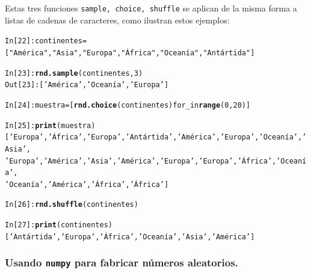 \documentclass[10pt,a4paper]{article}\usepackage[]{graphicx}\usepackage[]{color}
\makeatletter
\newcommand{\hlstr}[1]{\textcolor[rgb]{0.192,0.494,0.8}{#1}}%
\newcommand{\hlkwd}[1]{\textcolor[rgb]{0.737,0.353,0.396}{\textbf{#1}}}%
\newenvironment{kframe}{%
 \def\at@end@of@kframe{}%
 \ifinner\ifhmode%
  \def\at@end@of@kframe{\end{minipage}}%
  \begin{minipage}{\columnwidth}%
 \fi\fi%
 \def\FrameCommand##1{\hskip\@totalleftmargin \hskip-\fboxsep
 \colorbox{shadecolor}{##1}\hskip-\fboxsep
     \hskip-\linewidth \hskip-\@totalleftmargin \hskip\columnwidth}%
 \MakeFramed {\advance\hsize-\width
   \@totalleftmargin\z@ \linewidth\hsize
   \@setminipage}}%
 {\par\unskip\endMakeFramed%
 \at@end@of@kframe}
\newenvironment{knitrout}{}{} %
\newcounter {cont01}
\makeatother
\begin{document}
Estas tres funciones {\tt sample, choice, shuffle} se aplican de la misma forma a listas de cadenas de caracteres, como ilustran estos ejemplos:
\begin{knitrout}
\color{fgcolor}\begin{kframe}
\begin{alltt}
In [22]: continentes = [\hlstr{"América"}, \hlstr{"Asia"}, \hlstr{"Europa"}, \hlstr{"África"}, \hlstr{"Oceanía"}, \hlstr{"Antártida"}]

In [23]: \hlkwd{rnd.sample}(continentes, 3)
Out[23]: [\hlstr{'América'}, \hlstr{'Oceanía'}, \hlstr{'Europa'}]

In [24]: muestra = [\hlkwd{rnd.choice}(continentes) for _ in \hlkwd{range}(0, 20)]

In [25]: \hlkwd{print}(muestra)
[\hlstr{'Europa'}, \hlstr{'África'}, \hlstr{'Europa'}, \hlstr{'Antártida'}, \hlstr{'América'}, \hlstr{'Europa'}, \hlstr{'Oceanía'}, \hlstr{'Asia'},
\hlstr{'Europa'}, \hlstr{'América'}, \hlstr{'Asia'}, \hlstr{'América'}, \hlstr{'Europa'}, \hlstr{'Europa'}, \hlstr{'África'}, \hlstr{'Oceanía'},
\hlstr{'Oceanía'}, \hlstr{'América'}, \hlstr{'África'}, \hlstr{'África'}]

In [26]: \hlkwd{rnd.shuffle}(continentes)

In [27]: \hlkwd{print}(continentes)
[\hlstr{'Antártida'}, \hlstr{'Europa'}, \hlstr{'África'}, \hlstr{'Oceanía'}, \hlstr{'Asia'}, \hlstr{'América'}]
\end{alltt}
\end{kframe}
\end{knitrout}

\subsubsection*{Usando {\tt numpy} para fabricar números aleatorios.}
\label{tut02:subsubsec:usandoNumpyNumerosAleatorios}
\end{document}
